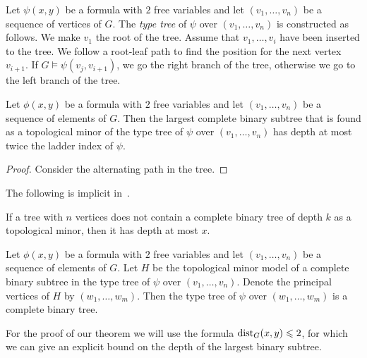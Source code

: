 Let $\psi(x,y)$ be a formula with $2$ free variables and let $(v_1,\ldots, v_n)$
be a sequence of vertices of $G$. The \emph{type tree}
of $\psi$ over $(v_1,\ldots,v_n)$ is constructed as 
follows. We make $v_1$ the root of the tree. Assume that $v_1,\ldots, v_i$
have been inserted to the tree. We follow a root-leaf path to find the
position for the next vertex $v_{i+1}$. If $G\models\psi(v_j,v_{i+1})$, we
go the right branch of the tree, otherwise we go to the left branch of 
the tree. 


\begin{theorem}
Let $\phi(x,y)$ be a formula with $2$ free variables and let
$(v_1,\ldots, v_n)$ be a sequence of elements of $G$. Then the 
largest complete binary subtree that is found as a topological minor 
of the type tree of $\psi$ over
$(v_1,\ldots, v_n)$ has depth at most twice the ladder
index of $\psi$. 
\end{theorem}
\begin{proof}
Consider the alternating path in the tree. 
\end{proof}

The following is implicit in~\cite{malliaris2014regularity}. 

\begin{lemma}[reference?]\label{lem:depth}
If a tree with $n$ vertices does not contain a complete binary 
tree of depth $k$ as a topological minor, then it has depth at most 
$x$. 
\end{lemma}

\begin{lemma}\label{lem:minor-to-tree}
Let $\phi(x,y)$ be a formula with $2$ free variables and let
$(v_1,\ldots, v_n)$ be a sequence of elements of $G$. Let $H$
be the topological minor model of a complete binary subtree in the
type tree of $\psi$ over $(v_1,\ldots, v_n)$. Denote the 
principal vertices of $H$ by $(w_1,\ldots, w_m)$. Then the type
tree of $\psi$ over $(w_1,\ldots, w_m)$ is a complete binary
tree. 
\end{lemma}

For the proof of our theorem we will use the formula 
$\mathrm{dist}_G(x,y)\leqslant 2$, for which we can give an explicit 
bound on the depth of the largest binary subtree.

